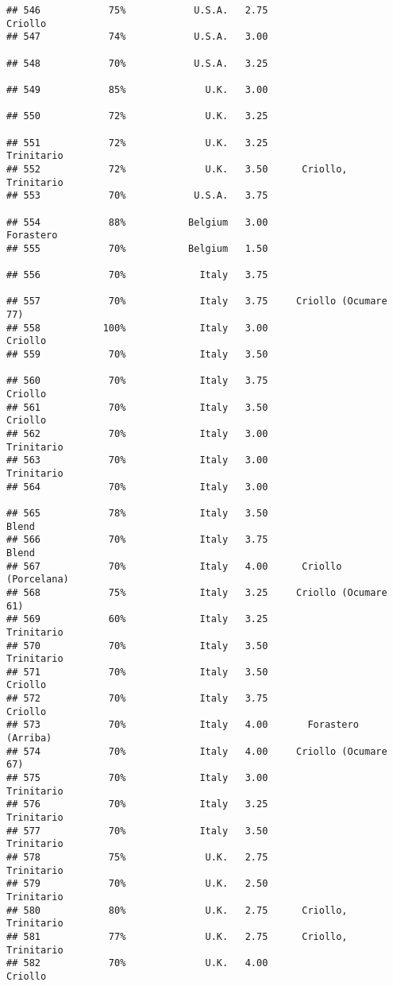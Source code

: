 \documentclass[
]{article}
\begin{document}
\begin{verbatim}
## 546            75%            U.S.A.   2.75                  Criollo
## 547            74%            U.S.A.   3.00                         
## 548            70%            U.S.A.   3.25                         
## 549            85%              U.K.   3.00                         
## 550            72%              U.K.   3.25                         
## 551            72%              U.K.   3.25               Trinitario
## 552            72%              U.K.   3.50      Criollo, Trinitario
## 553            70%            U.S.A.   3.75                         
## 554            88%           Belgium   3.00                Forastero
## 555            70%           Belgium   1.50                         
## 556            70%             Italy   3.75                         
## 557            70%             Italy   3.75     Criollo (Ocumare 77)
## 558           100%             Italy   3.00                  Criollo
## 559            70%             Italy   3.50                         
## 560            70%             Italy   3.75                  Criollo
## 561            70%             Italy   3.50                  Criollo
## 562            70%             Italy   3.00               Trinitario
## 563            70%             Italy   3.00               Trinitario
## 564            70%             Italy   3.00                         
## 565            78%             Italy   3.50                    Blend
## 566            70%             Italy   3.75                    Blend
## 567            70%             Italy   4.00      Criollo (Porcelana)
## 568            75%             Italy   3.25     Criollo (Ocumare 61)
## 569            60%             Italy   3.25               Trinitario
## 570            70%             Italy   3.50               Trinitario
## 571            70%             Italy   3.50                  Criollo
## 572            70%             Italy   3.75                  Criollo
## 573            70%             Italy   4.00       Forastero (Arriba)
## 574            70%             Italy   4.00     Criollo (Ocumare 67)
## 575            70%             Italy   3.00               Trinitario
## 576            70%             Italy   3.25               Trinitario
## 577            70%             Italy   3.50               Trinitario
## 578            75%              U.K.   2.75               Trinitario
## 579            70%              U.K.   2.50               Trinitario
## 580            80%              U.K.   2.75      Criollo, Trinitario
## 581            77%              U.K.   2.75      Criollo, Trinitario
## 582            70%              U.K.   4.00                  Criollo

\end{verbatim}
\end{document}
